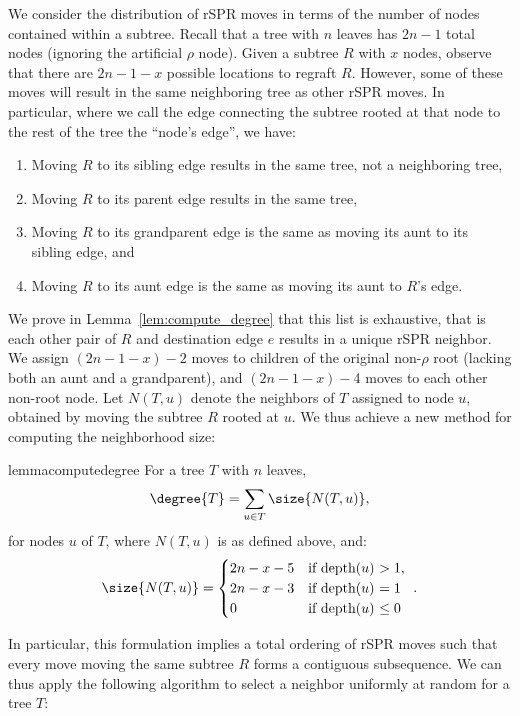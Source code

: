 \documentclass[11pt]{amsart}
\begin{document}
We consider the distribution of rSPR moves in terms of the number of nodes contained within a subtree.
Recall that a tree with $n$ leaves has $2n-1$ total nodes (ignoring the artificial $\rho$ node).
Given a subtree $R$ with $x$ nodes, observe that there are $2n-1 - x$ possible locations to regraft $R$.
However, some of these moves will result in the same neighboring tree as other rSPR moves.
In particular, where we call the edge connecting the subtree rooted at that node to the rest of the tree the ``node's edge'', we have:
\begin{enumerate}
\item Moving $R$ to its sibling edge results in the same tree, not a neighboring tree,
\item Moving $R$ to its parent edge results in the same tree,
\item Moving $R$ to its grandparent edge is the same as moving its aunt to its sibling edge, and
\item Moving $R$ to its aunt edge is the same as moving its aunt to $R$'s edge.
\end{enumerate}
We prove in Lemma~\ref{lem:compute_degree} that this list is exhaustive, that is each other pair of $R$ and destination edge $e$ results in a unique rSPR neighbor.
We assign $(2n-1-x)-2$ moves to children of the original non-$\rho$ root (lacking both an aunt and a grandparent), and $(2n-1-x)-4$ moves to each other non-root node.
Let $N(T,u)$ denote the neighbors of $T$ assigned to node $u$, obtained by moving the subtree $R$ rooted at $u$.
We thus achieve a new method for computing the neighborhood size:

\begin{restatable}{lemma}{computedegree}
	\label{lem:compute_degree}
	For a tree $T$ with $n$ leaves,
	$$\degree{T} = \sum_{u \in T} \size{N(T,u)},$$
	for nodes $u$ of $T$, where $N(T,u)$ is as defined above, and:
	$$\size{N(T,u)} = \begin{cases}
		2n - x - 5 &\text{if depth($u$) $ > 1$, } \\
		2n - x - 3 &\text{if depth($u$) $ = 1$ } \\
		0 &\text{if depth($u$) $ \le 0$ } \\
	\end{cases}.$$
\end{restatable}


In particular, this formulation implies a total ordering of rSPR moves such that every move moving the same subtree $R$ forms a contiguous subsequence.
We can thus apply the following algorithm to select a neighbor uniformly at random for a tree $T$:
\end{document}
